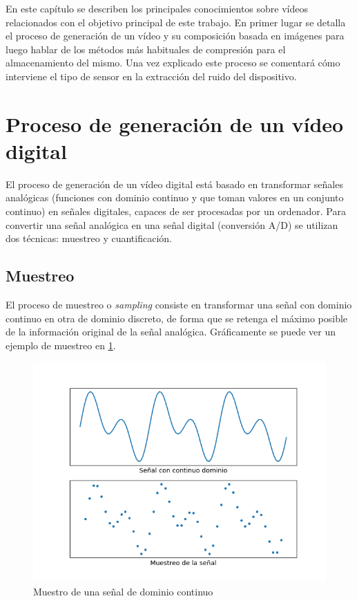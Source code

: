 En este capítulo se describen los principales conocimientos sobre vídeos relacionados con el objetivo principal de este trabajo. En primer lugar se detalla el proceso de generación de un vídeo y su composición basada en imágenes para luego hablar de los métodos más habituales de compresión para el almacenamiento del mismo. Una vez explicado este proceso se comentará cómo interviene el tipo de sensor en la extracción del ruido del dispositivo.

\section{Proceso de generación de un vídeo digital}
El proceso de generación de un vídeo digital está basado en transformar se\~nales analógicas (funciones con dominio continuo y que toman valores en un conjunto continuo) en se\~nales digitales, capaces de ser procesadas por un ordenador. Para convertir una se\~nal analógica en una se\~nal digital (conversión A/D) se utilizan dos técnicas: muestreo y cuantificación.
\subsection{Muestreo}
El proceso de muestreo o \textit{sampling} consiste en transformar una se\~nal con dominio continuo en otra de dominio discreto, de forma que se retenga el máximo posible de la información original de la se\~nal analógica. Gráficamente se puede ver un ejemplo de muestreo en \ref{fig_muestreo}.

\begin{figure}[ht!]
\begin{center}
\includegraphics{figuras/muestreo.png}
\end{center}
\caption{Muestro de una se\~nal de dominio continuo}
\label{fig_muestreo}
\end{figure}


